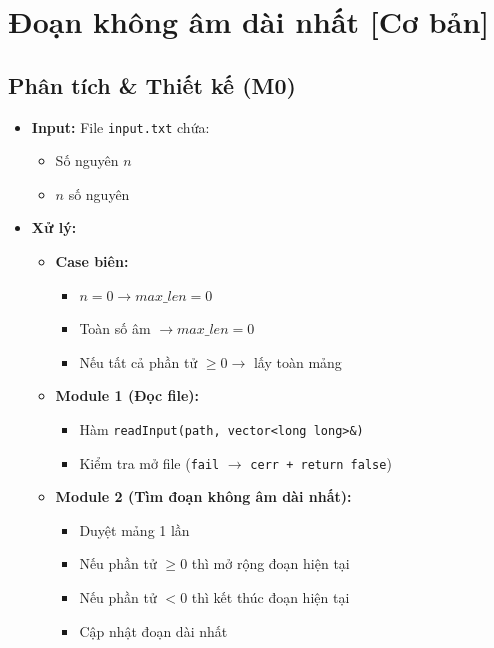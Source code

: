 \section{Đoạn không âm dài nhất [Cơ bản]}
\subsection{Phân tích \& Thiết kế (M0)}
\begin{itemize}
    \item \textbf{Input:}
    File \texttt{input.txt} chứa:
    \begin{itemize}
        \item Số nguyên $n$
        \item $n$ số nguyên
    \end{itemize}

    \item \textbf{Xử lý:}
    \begin{itemize}
        \item \textbf{Case biên:}
        \begin{itemize}
            \item $n = 0 \rightarrow max\_len = 0$
            \item Toàn số âm $\rightarrow max\_len = 0$
            \item Nếu tất cả phần tử $\geq 0 \rightarrow$ lấy toàn mảng
        \end{itemize}

        \item \textbf{Module 1 (Đọc file):}
        \begin{itemize}
            \item Hàm \texttt{readInput(path, vector<long long>\&)}
            \item Kiểm tra mở file (\texttt{fail} $\rightarrow$ \texttt{cerr + return false})
        \end{itemize}

        \item \textbf{Module 2 (Tìm đoạn không âm dài nhất):}
        \begin{itemize}
            \item Duyệt mảng 1 lần
            \item Nếu phần tử $\geq 0$ thì mở rộng đoạn hiện tại
            \item Nếu phần tử $< 0$ thì kết thúc đoạn hiện tại
            \item Cập nhật đoạn dài nhất
        \end{itemize}


\end{itemize}
\end{itemize}
